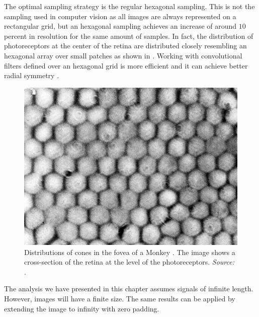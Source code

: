 The optimal sampling strategy is the regular hexagonal sampling. This is not the sampling used in computer vision as all images are always represented on a rectangular grid, but an hexagonal sampling achieves an increase of around $10$ percent in resolution for the same amount of samples. In fact, the distribution of photoreceptors at the center of the retina \cite{Curcio87,Curcio1990} are distributed closely resembling an hexagonal array over small patches as shown in \fig{\ref{fig:samplingfovea}}.
Working with convolutional filters defined over an hexagonal grid is more efficient and it can achieve better radial symmetry \cite{Mersereau79,Simoncelli90subbandimage}.




\begin{figure}[t]
    \centerline{
        \includegraphics[width=.6\linewidth]{figures/Image_processing_sampling/sampling_fovea.jpg}}
    \caption{Distributions of cones in the fovea of a Monkey  \cite{Curcio1990}. The image shows a cross-section of the retina at the level of the photoreceptors. {\em Source:} \cite{Curcio1990}.}
    \label{fig:samplingfovea}
\end{figure}

The analysis we have presented in this chapter assumes signals of infinite length. However, images will have a finite size. The same results can be applied by extending the image to infinity with zero padding.

